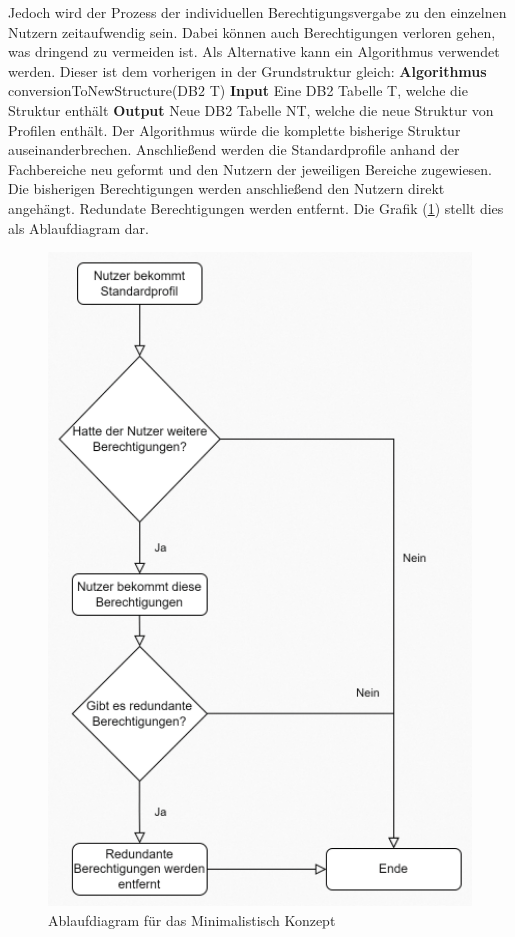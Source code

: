 Jedoch wird der Prozess der individuellen Berechtigungsvergabe zu den einzelnen Nutzern zeitaufwendig sein.
Dabei können auch Berechtigungen verloren gehen, was dringend zu vermeiden ist.
\newline
Als Alternative kann ein Algorithmus verwendet werden.
Dieser ist dem vorherigen in der Grundstruktur gleich:
\newline
\newline
\textbf{Algorithmus} conversionToNewStructure(DB$2$ T)
\newline
\newline
\textbf{Input} Eine DB2 Tabelle T, welche die Struktur enthält
\newline
\newline
\textbf{Output} Neue DB2 Tabelle NT, welche die neue Struktur von Profilen enthält.
\newline
\newline
Der Algorithmus würde die komplette bisherige Struktur auseinanderbrechen.
Anschließend werden die Standardprofile anhand der Fachbereiche neu geformt und den Nutzern der jeweiligen Bereiche zugewiesen.
Die bisherigen Berechtigungen werden anschließend den Nutzern direkt angehängt.
Redundate Berechtigungen werden entfernt.
Die Grafik (\ref{fig:Mini}) stellt dies als Ablaufdiagram dar.
\begin{figure}[h!]
 \centering
 \includegraphics[width=1\textwidth]{gfx/Picture/Mini.PNG}
 \caption{Ablaufdiagram für das Minimalistisch Konzept}
 \label{fig:Mini}
\end{figure}